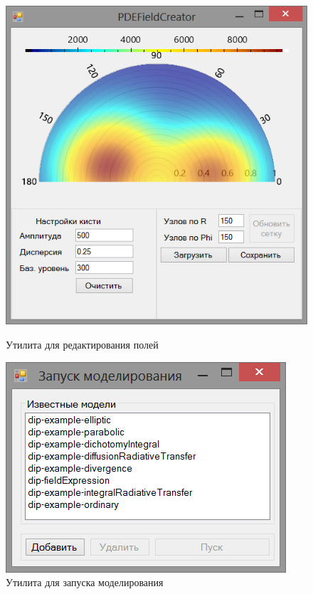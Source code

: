 \begin{figure}
    \centering
    \begin{minipage}[b]{.45\textwidth}
        \centering
        \includegraphics[width=.95\linewidth]{img/scr/fieldCreator}
        \caption{Утилита для редактирования полей}
        \label{fig:scrFC}
    \end{minipage}%
    \hspace{.1\linewidth}%
    \begin{minipage}[b]{.45\textwidth}
        \centering
        \includegraphics[width=.95\linewidth]{img/scr/launcher}
        \caption{Утилита для запуска моделирования}
        \label{fig:scrLauncher}
    \end{minipage}
\end{figure}

